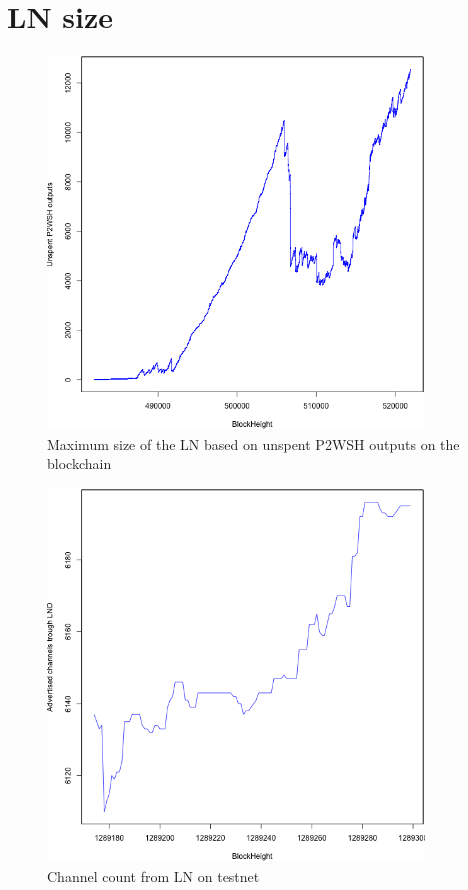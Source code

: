 \section{LN size}

\begin{figure}[h]
    \centering
    \includegraphics[width=10cm]{figures/graphs/lnsize_mainnet.png}
    \caption{Maximum size of the LN based on unspent P2WSH outputs on the blockchain}
    \label{fig:htlc_bc}
\end{figure}

\begin{figure}[t]
    \centering
    \includegraphics[width=10cm]{figures/lnsizeTS.png}
    \caption{Channel count from LN on testnet}
    \label{fig:htlc_bc}
\end{figure}


